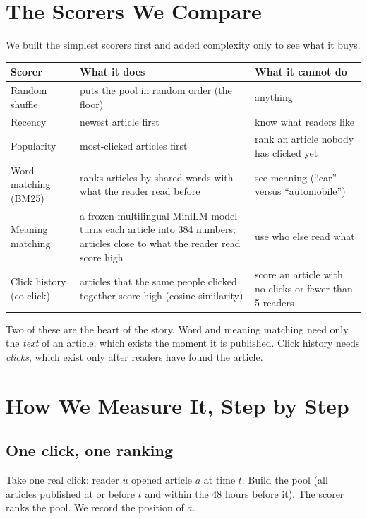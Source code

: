 \documentclass[11pt,a4paper]{article}
\begin{document}
\section{The Scorers We Compare}
We built the simplest scorers first and added complexity only to see what it buys.
\begin{center}
\small
\begin{tabularx}{\linewidth}{@{}lXX@{}}
\toprule
\textbf{Scorer} & \textbf{What it does} & \textbf{What it cannot do}\\
\midrule
Random shuffle & puts the pool in random order (the floor) & anything\\
Recency & newest article first & know what readers like\\
Popularity & most-clicked articles first & rank an article nobody has clicked yet\\
Word matching (BM25) & ranks articles by shared words with what the reader read before & see meaning (``car'' versus ``automobile'')\\
Meaning matching & a frozen multilingual MiniLM model turns each article into 384 numbers; articles close to what the reader read score high & use who else read what\\
Click history (co-click) & articles that the same people clicked together score high (cosine similarity) & score an article with no clicks or fewer than 5 readers\\
\bottomrule
\end{tabularx}
\end{center}
Two of these are the heart of the story. Word and meaning matching need only the \emph{text} of an article, which exists the moment it is published. Click history needs \emph{clicks}, which exist only after readers have found the article.

\section{How We Measure It, Step by Step}
\subsection{One click, one ranking}
Take one real click: reader $u$ opened article $a$ at time $t$. Build the pool (all articles published at or before $t$ and within the 48 hours before it). The scorer ranks the pool. We record the position of $a$.
\end{document}
